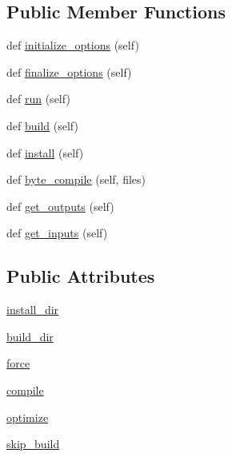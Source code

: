 \subsection*{Public Member Functions}
\begin{DoxyCompactItemize}
\item 
def \hyperlink{classsetuptools_1_1__distutils_1_1command_1_1install__lib_1_1install__lib_a27598c070113d4cd3f232564ef297ee1}{initialize\+\_\+options} (self)
\item 
def \hyperlink{classsetuptools_1_1__distutils_1_1command_1_1install__lib_1_1install__lib_afe9cf58ac99c3f1c5ed4aa1525a65415}{finalize\+\_\+options} (self)
\item 
def \hyperlink{classsetuptools_1_1__distutils_1_1command_1_1install__lib_1_1install__lib_a1c0172f47a7203a3044af96bf632f80e}{run} (self)
\item 
def \hyperlink{classsetuptools_1_1__distutils_1_1command_1_1install__lib_1_1install__lib_a8be54c86c5c89436d295b32d917407fc}{build} (self)
\item 
def \hyperlink{classsetuptools_1_1__distutils_1_1command_1_1install__lib_1_1install__lib_a64144cbe4a12ebee713a754edad67e7f}{install} (self)
\item 
def \hyperlink{classsetuptools_1_1__distutils_1_1command_1_1install__lib_1_1install__lib_a18efba012f527ae4595d5c652b5e30a2}{byte\+\_\+compile} (self, files)
\item 
def \hyperlink{classsetuptools_1_1__distutils_1_1command_1_1install__lib_1_1install__lib_aae96e70e25d56d3535bb67c19cc4413a}{get\+\_\+outputs} (self)
\item 
def \hyperlink{classsetuptools_1_1__distutils_1_1command_1_1install__lib_1_1install__lib_a77e23023d7afd390f780bb91b10bc726}{get\+\_\+inputs} (self)
\end{DoxyCompactItemize}
\subsection*{Public Attributes}
\begin{DoxyCompactItemize}
\item 
\hyperlink{classsetuptools_1_1__distutils_1_1command_1_1install__lib_1_1install__lib_a116b16565ee3d72f5d744cafa00c0b6f}{install\+\_\+dir}
\item 
\hyperlink{classsetuptools_1_1__distutils_1_1command_1_1install__lib_1_1install__lib_aaf447aece57e153b830402c910b5a3b3}{build\+\_\+dir}
\item 
\hyperlink{classsetuptools_1_1__distutils_1_1command_1_1install__lib_1_1install__lib_a32aeb0a29fe0d40bdf14cd33dda98bc1}{force}
\item 
\hyperlink{classsetuptools_1_1__distutils_1_1command_1_1install__lib_1_1install__lib_ac03423a22c9f6fb2db15ab45b25500e4}{compile}
\item 
\hyperlink{classsetuptools_1_1__distutils_1_1command_1_1install__lib_1_1install__lib_a527332ecfdb214699dfb34b6bb77ccd0}{optimize}
\item 
\hyperlink{classsetuptools_1_1__distutils_1_1command_1_1install__lib_1_1install__lib_aa7304ce9342501a3ecec06260b578262}{skip\+\_\+build}
\end{DoxyCompactItemize}

